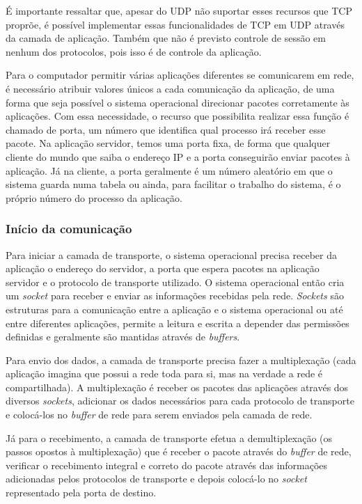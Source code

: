 \documentclass[brazilian,a4paper,twocolumn]{article}
\begin{document}
É importante ressaltar que, apesar do UDP não suportar esses recursos que TCP proprõe, é possível implementar essas funcionalidades de TCP em UDP através da camada de aplicação. Também que não é previsto controle de sessão em nenhum dos protocolos, pois isso é de controle da aplicação.

Para o computador permitir várias aplicações diferentes se comunicarem em rede, é necessário atribuir valores únicos a cada comunicação da aplicação, de uma forma que seja possível o sistema operacional direcionar pacotes corretamente às aplicações. Com essa necessidade, o recurso que possibilita realizar essa função é chamado de porta, um número que identifica qual processo irá receber esse pacote. Na aplicação servidor, temos uma porta fixa, de forma que qualquer cliente do mundo que saiba o endereço IP e a porta conseguirão enviar pacotes à aplicação. Já na cliente, a porta geralmente é um número aleatório em que o sistema guarda numa tabela ou ainda, para facilitar o trabalho do sistema, é o próprio número do processo da aplicação.

\subsubsection{Início da comunicação}

Para iniciar a camada de transporte, o sistema operacional precisa receber da aplicação o endereço do servidor, a porta que espera pacotes na aplicação servidor e o protocolo de transporte utilizado. O sistema operacional então cria um \textit{socket} para receber e enviar as informações recebidas pela rede. \textit{Sockets} são estruturas para a comunicação entre a aplicação e o sistema operacional ou até entre diferentes aplicações, permite a leitura e escrita a depender das permissões definidas e geralmente são mantidas através de \textit{buffers}.

Para envio dos dados, a camada de transporte precisa fazer a multiplexação (cada aplicação imagina que possui a rede toda para si, mas na verdade a rede é compartilhada). A multiplexação é receber os pacotes das aplicações através dos diversos \textit{sockets}, adicionar os dados necessários para cada protocolo de transporte e colocá-los no \textit{buffer} de rede para serem enviados pela camada de rede.

Já para o recebimento, a camada de transporte efetua a demultiplexação (os passos opostos à multiplexação) que é receber o pacote através do \textit{buffer} de rede, verificar o recebimento integral e correto do pacote através das informações adicionadas pelos protocolos de transporte e depois colocá-lo no \textit{socket} representado pela porta de destino.
\end{document}
